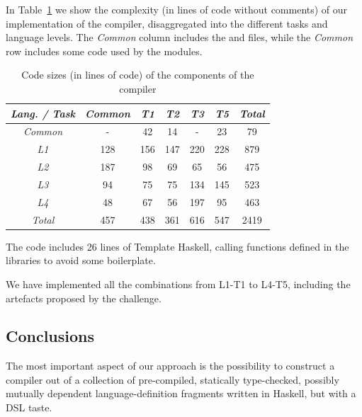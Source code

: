 In Table~\ref{table:locs} we show the complexity (in lines of code without comments) of our implementation of the compiler,
disaggregated into the different tasks and language levels.
The \emph{Common} column includes the  and  files,
while the \emph{Common} row includes some code used by the  modules.
\begin{table}\centering
\begin{tabular}{ | c || c | c | c | c | c | c | }
  \hline                        
  \emph{Lang. / Task} & \emph{Common} & \emph{T1} & \emph{T2} & \emph{T3} & \emph{T5} & \emph{Total} \\
  \hline                        
  \hline                        
  \emph{Common} & - & 42 & 14 & - & 23 & 79  \\
  \hline                        
  \emph{L1} & 128 & 156 & 147 & 220 & 228 & 879  \\
  \hline  
  \emph{L2} & 187 & 98 & 69 & 65 & 56 & 475  \\
  \hline  
  \emph{L3} & 94 & 75 & 75 & 134 & 145 & 523  \\
  \hline 
  \emph{L4} & 48 & 67 & 56 & 197 & 95 & 463  \\
  \hline 
  \emph{Total} & 457 & 438 & 361 & 616 & 547 & 2419  \\
  \hline 
\end{tabular}
\caption{Code sizes (in lines of code) of the components of the compiler}
\label{table:locs}
\end{table}

The code includes 26 lines of Template Haskell, calling functions defined in the libraries to avoid some boilerplate.

We have implemented all the combinations from L1-T1 to L4-T5, including the artefacts proposed by the challenge.



\subsection{Conclusions}

The most important aspect of our approach is the possibility to construct a compiler 
out of a collection of pre-compiled, statically type-checked, possibly mutually dependent
language-definition fragments written in Haskell, but with a DSL taste.

